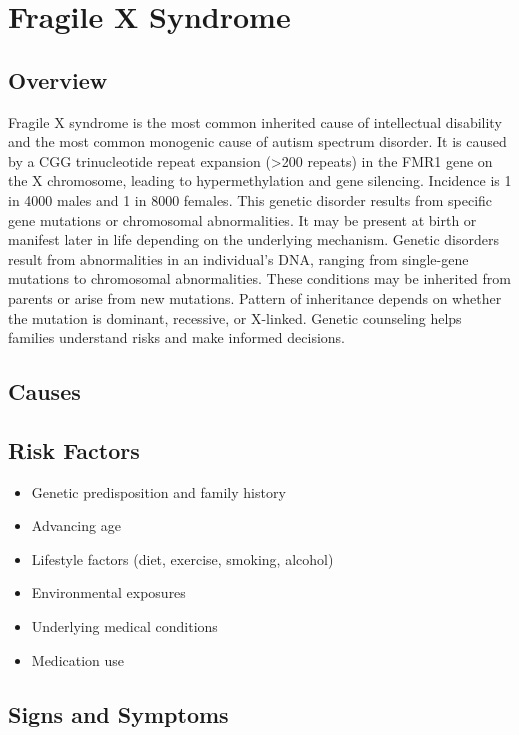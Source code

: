 \chapter{Fragile X Syndrome}
\label{sec:Fragile X Syndrome}

\section{Overview}
Fragile X syndrome is the most common inherited cause of intellectual disability and the most common monogenic cause of autism spectrum disorder. It is caused by a CGG trinucleotide repeat expansion (>200 repeats) in the FMR1 gene on the X chromosome, leading to hypermethylation and gene silencing. Incidence is 1 in 4000 males and 1 in 8000 females. This genetic disorder results from specific gene mutations or chromosomal abnormalities. It may be present at birth or manifest later in life depending on the underlying mechanism. Genetic disorders result from abnormalities in an individual's DNA, ranging from single-gene mutations to chromosomal abnormalities. These conditions may be inherited from parents or arise from new mutations. Pattern of inheritance depends on whether the mutation is dominant, recessive, or X-linked. Genetic counseling helps families understand risks and make informed decisions.
\section{Causes}
\section{Risk Factors}

\begin{itemize}[noitemsep]
  \item Genetic predisposition and family history
  \item Advancing age
  \item Lifestyle factors (diet, exercise, smoking, alcohol)
  \item Environmental exposures
  \item Underlying medical conditions
  \item Medication use
\end{itemize}
\section{Signs and Symptoms}

